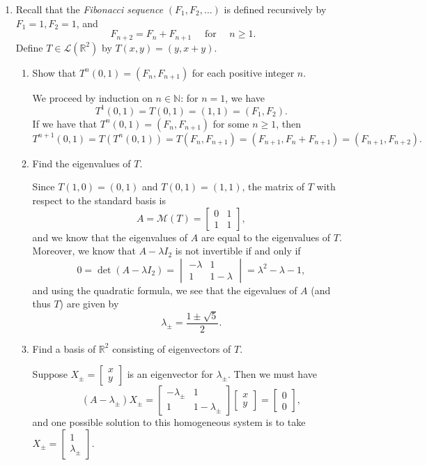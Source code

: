 \documentclass[letterpaper,12pt]{article}
\newcommand{\R}{\mathbb{R}}
\begin{document}
\begin{enumerate}
\bigskip

 \item Recall that the {\em Fibonacci sequence} $(F_1,F_2,\ldots)$ is defined recursively by $F_1=1, F_2=1$, and
 \[
 F_{n+2} = F_{n}+F_{n+1} \quad\text{ for }\quad n\geq 1.
 \]
 Define $T\in\mathcal{L}(\R^2)$ by $T(x,y) = (y,x+y)$.
 \begin{enumerate}
 \item Show that $T^n(0,1)=(F_n,F_{n+1})$ for each positive integer $n$.

\bigskip

We proceed by induction on $n\in\mathbb{N}$: for $n=1$, we have
\[
 T^1(0,1) = T(0,1) = (1,1) = (F_1,F_2).
\]
If we have that $T^n(0,1)=(F_n,F_{n+1})$ for some $n\geq 1$, then
\[
 T^{n+1}(0,1) = T(T^n(0,1)) = T(F_n,F_{n+1}) = (F_{n+1},F_{n}+F_{n+1}) = (F_{n+1},F_{n+2}).
\]

\bigskip

 \item Find the eigenvalues of $T$.

\bigskip

Since $T(1,0) = (0,1)$ and $T(0,1)=(1,1)$, the matrix of $T$ with respect to the standard basis is
\[
 A=\mathcal{M}(T)=\begin{bmatrix}0&1\\1&1\end{bmatrix},
\]
and we know that the eigenvalues of $A$ are equal to the eigenvalues of $T$. Moreover, we know that $A-\lambda I_2$ is not invertible if and only if
\[
 0 = \det(A-\lambda I_2) = \begin{vmatrix}-\lambda&1\\1&1-\lambda\end{vmatrix} = \lambda^2-\lambda-1,
\]
and using the quadratic formula, we see that the eigevalues of $A$ (and thus $T$) are given by
\[
 \lambda_\pm = \frac{1\pm\sqrt{5}}{2}.
\]

\bigskip

 \item Find a basis of $\R^2$ consisting of eigenvectors of $T$.

\bigskip

Suppose $X_\pm=\begin{bmatrix}x\\y\end{bmatrix}$ is an eigenvector for $\lambda_\pm$. Then we must have
\[
 (A-\lambda_\pm)X_\pm = \begin{bmatrix}-\lambda_\pm &1\\1&1-\lambda_\pm\end{bmatrix}\begin{bmatrix}x\\y\end{bmatrix} = \begin{bmatrix}0\\0\end{bmatrix},
\]
and one possible solution to this homogeneous system is to take $X_\pm = \begin{bmatrix}1\\\lambda_\pm\end{bmatrix}$.


\end{enumerate}
\end{enumerate}
\end{document}
